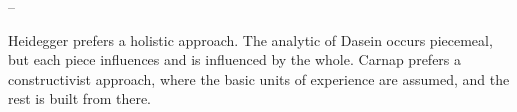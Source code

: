 \documentclass[leqno, 12pt]{turabian-researchpaper}
\begin{document}
	--

	Heidegger prefers a holistic approach. The analytic of Dasein occurs piecemeal,
	but each piece influences and is influenced by the whole. Carnap prefers a
	constructivist approach, where the basic units of experience are assumed, and
	the rest is built from there.




\end{document}
